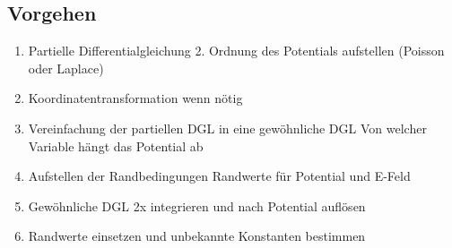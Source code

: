 \subsection{Vorgehen}
	\begin{enumerate}
		\item Partielle Differentialgleichung 2. Ordnung des Potentials aufstellen (Poisson oder Laplace)
		\item Koordinatentransformation wenn nötig
		\item Vereinfachung der partiellen DGL in eine gewöhnliche DGL 
		\subitem Von welcher Variable hängt das Potential ab
		\item Aufstellen der Randbedingungen
		\subitem Randwerte für Potential und E-Feld
		\item Gewöhnliche DGL 2x integrieren und nach Potential auflösen
		\item Randwerte einsetzen und unbekannte Konstanten bestimmen
	\end{enumerate}
\clearpage
\pagebreak